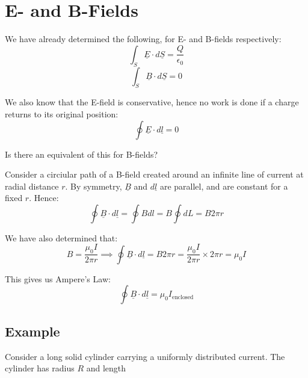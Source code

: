 \section{E- and B-Fields}
We have already determined the following, for E- and B-fields respectively:
\[
    \int_S \underline{E} \cdot d \underline{S} = \frac{Q}{\epsilon_0} \tag{E}
\]
\[
    \int_S \underline{B} \cdot d \underline{S} = 0 \tag{B}
\]

We also know that the E-field is conservative, hence no work is done if a charge returns to its original position:
\[
    \oint \underline{E} \cdot d \underline{l} = 0
\]

Is there an equivalent of this for B-fields?

Consider a circiular path of a B-field created around an infinite line of current at radial distance $r$. By symmetry, $\underline{B}$ and $d \underline{l}$ are parallel, and are constant for a fixed $r$. Hence:
\[
    \oint \underline{B} \cdot d \underline{l} = \oint B dl = B \oint dL = B 2 \pi r
\]

We have also determined that:
\[
    B = \frac{\mu_0 I}{2 \pi r} \implies \oint \underline{B} \cdot d \underline{l} = B 2 \pi r = \frac{\mu_0 I}{2 \pi r} \times 2 \pi r = \mu_0 I
\]


This gives us Ampere's Law:
\[
    \boxed{\oint \underline{B} \cdot d \underline{l} = \mu_0 I_\text{enclosed}}
\]

\subsection{Example}
Consider a long solid cylinder carrying a uniformly distributed current. The cylinder has radius $R$ and length
